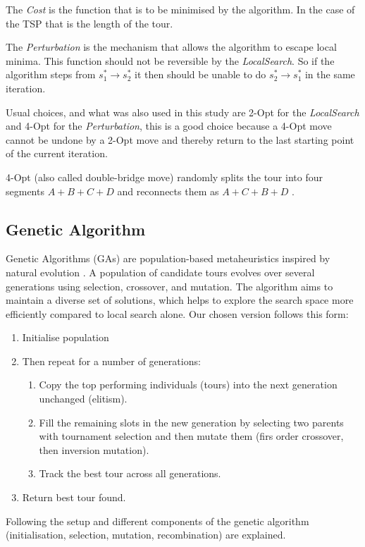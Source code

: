 The \textit{Cost} is the function that is to be minimised by the algorithm.
In the case of the TSP that is the length of the tour.

The \textit{Perturbation} is the mechanism that allows the algorithm to escape local minima. This function should not be reversible by the \textit{LocalSearch}.
So if the algorithm steps from \( s^*_1 \to s^*_2 \) it then should be unable to do \(  s_2^* \to  s_1^* \) in the same iteration.

Usual choices, and what was also used in this study are 2-Opt for the \textit{LocalSearch} and 4-Opt for the \textit{Perturbation},
this is a good choice because a 4-Opt move cannot be undone by a 2-Opt move and thereby return to the last starting point of the current iteration.

4-Opt (also called double-bridge move) randomly splits the tour into four segments \( A+B+C+D \) and reconnects them as \( A+C+B+D \) \cite{lourencoIteratedLocalSearch2019}.






\subsection{Genetic Algorithm}\label{subsec:genetic}
Genetic Algorithms (GAs) are population-based metaheuristics inspired by natural evolution \cite{whitleyNextGenerationGenetic2019}.
A population of candidate tours evolves over several generations using selection, crossover, and mutation.
The algorithm aims to maintain a diverse set of solutions, which helps to explore the search space more efficiently compared to local search alone.
Our chosen version follows this form:
\begin{enumerate}
	\item Initialise population
	\item Then repeat for a number of generations: \begin{enumerate}
		      \item Copy the top performing individuals (tours) into the next generation unchanged (elitism).
		      \item Fill the remaining slots in the new generation by selecting two parents with tournament selection and then mutate them (firs order crossover, then inversion mutation).
		      \item Track the best tour across all generations.
	      \end{enumerate}
	\item Return best tour found.
\end{enumerate}
Following the setup and different components of the genetic algorithm (initialisation, selection, mutation, recombination) are explained.


